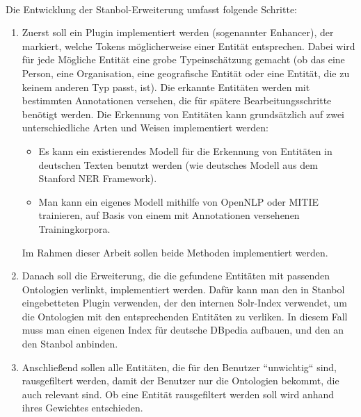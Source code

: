 \paragraph{}
Die Entwicklung der Stanbol-Erweiterung umfasst folgende Schritte:
\begin{enumerate}
\item Zuerst soll ein Plugin implementiert werden (sogenannter Enhancer), der markiert, welche Tokens möglicherweise einer Entität entsprechen. Dabei wird für jede Mögliche Entität eine grobe Typeinschätzung gemacht (ob das eine Person, eine Organisation, eine geografische Entität oder eine Entität, die zu keinem anderen Typ passt, ist). Die erkannte Entitäten werden mit bestimmten Annotationen versehen, die für spätere Bearbeitungsschritte benötigt werden. Die Erkennung von Entitäten kann grundsätzlich auf zwei unterschiedliche Arten und Weisen implementiert werden:  
\begin{itemize}
\item Es kann ein existierendes Modell für die Erkennung von Entitäten in deutschen Texten benutzt werden (wie deutsches Modell aus dem Stanford NER Framework).
\item Man kann ein eigenes Modell mithilfe von OpenNLP oder MITIE trainieren, auf Basis von einem mit Annotationen versehenen Trainingkorpora.
\end{itemize}
Im Rahmen dieser Arbeit sollen beide Methoden implementiert werden.

\item Danach soll die Erweiterung, die die gefundene Entitäten mit passenden Ontologien verlinkt, implementiert werden. Dafür kann man den in Stanbol eingebetteten Plugin verwenden, der den internen Solr-Index verwendet, um die Ontologien mit den entsprechenden Entitäten zu verliken. In diesem Fall muss man einen eigenen Index für deutsche DBpedia aufbauen, und den an den Stanbol anbinden.

\item Anschließend sollen alle  Entitäten, die für den Benutzer ``unwichtig`` sind, rausgefiltert werden, damit der Benutzer nur die Ontologien bekommt, die auch relevant sind. Ob eine Entität rausgefiltert werden soll wird anhand ihres Gewichtes entschieden.
\end{enumerate}

